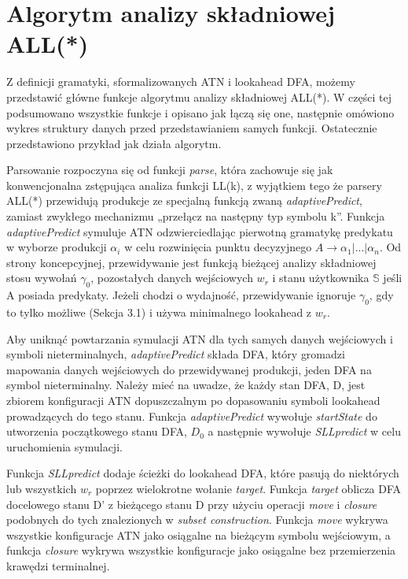 \section{Algorytm analizy składniowej ALL(*)}
Z definicji gramatyki, sformalizowanych ATN i lookahead DFA, możemy przedstawić główne funkcje
algorytmu analizy składniowej ALL(*).
W części tej podsumowano wszystkie funkcje i opisano jak łączą się one, następnie omówiono
wykres struktury danych przed przedstawianiem samych funkcji. Ostatecznie przedstawiono
przykład jak działa algorytm.
\par
Parsowanie rozpoczyna się od funkcji \textit{parse}, która zachowuje się jak konwencjonalna
zstępująca analiza funkcji LL(k), z wyjątkiem tego że parsery ALL(*) przewidują
produkcje ze specjalną funkcją zwaną \textit{adaptivePredict},
zamiast zwykłego mechanizmu „przełącz na następny typ symbolu k”.
Funkcja \textit{adaptivePredict} symuluje ATN odzwierciedlając pierwotną gramatykę
predykatu w wyborze produkcji $\alpha_i$ w celu rozwinięcia punktu decyzyjnego
$A \rightarrow \alpha_1 | ... | \alpha_n$.
Od strony koncepcyjnej, przewidywanie jest funkcją bieżącej analizy składniowej stosu wywołań
$\gamma_0$, pozostałych danych wejściowych $w_r$ i stanu użytkownika $\mathbb{S}$ jeśli A posiada predykaty.
Jeżeli chodzi o wydajność, przewidywanie ignoruje $\gamma_0$, gdy to tylko możliwe (Sekcja 3.1)
i używa minimalnego lookahead z $w_r$.
\par
Aby uniknąć powtarzania symulacji ATN dla tych samych danych wejściowych i symboli nieterminalnych,
\textit{adaptivePredict} składa DFA, który gromadzi mapowania danych wejściowych do przewidywanej produkcji,
jeden DFA na symbol nieterminalny.
Należy mieć na uwadze, że każdy stan DFA, D, jest zbiorem konfiguracji ATN dopuszczalnym po dopasowaniu
symboli lookahead prowadzących do tego stanu.
Funkcja \textit{adaptivePredict} wywołuje \textit{startState} do utworzenia początkowego stanu DFA,
\( D_0 \) a następnie wywołuje \textit{SLLpredict} w celu uruchomienia symulacji.
\par
Funkcja \textit{SLLpredict} dodaje ścieżki do lookahead DFA, które pasują do niektórych lub wszystkich
$w_r$ poprzez wielokrotne wołanie \textit{target}. Funkcja \textit{target} oblicza DFA docelowego stanu D'
z bieżącego stanu D przy użyciu operacji \textit{move} i \textit{closure} podobnych do tych
znalezionych w \textit{subset construction}.
Funkcja \textit{move} wykrywa wszystkie konfiguracje ATN jako osiągalne na bieżącym symbolu wejściowym,
a funkcja \textit{closure} wykrywa wszystkie konfiguracje jako osiągalne bez przemierzenia krawędzi terminalnej.
